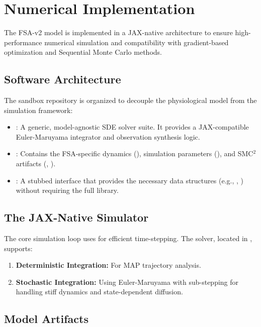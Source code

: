 \section{Numerical Implementation}

The FSA-v2 model is implemented in a JAX-native architecture to ensure high-performance numerical simulation and compatibility with gradient-based optimization and Sequential Monte Carlo methods.

\subsection{Software Architecture}

The sandbox repository is organized to decouple the physiological model from the simulation framework:
\begin{itemize}
    \item {}: A generic, model-agnostic SDE solver suite. It provides a JAX-compatible Euler-Maruyama integrator and observation synthesis logic.
    \item {}: Contains the FSA-specific dynamics (), simulation parameters (), and SMC${}^2$ artifacts (, ).
    \item {}: A stubbed interface that provides the necessary data structures (e.g., , ) without requiring the full  library.
\end{itemize}

\subsection{The JAX-Native Simulator}

The core simulation loop uses  for efficient time-stepping. The solver, located in , supports:
\begin{enumerate}
    \item \textbf{Deterministic Integration:} For MAP trajectory analysis.
    \item \textbf{Stochastic Integration:} Using Euler-Maruyama with sub-stepping for handling stiff dynamics and state-dependent diffusion.
\end{enumerate}

\subsection{Model Artifacts}

